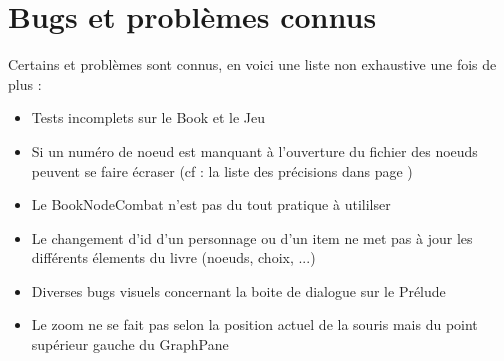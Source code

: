 	\section{Bugs et problèmes connus}

		Certains et problèmes sont connus, en voici une liste non exhaustive une fois de plus :

		\begin{itemize}
			\item{Tests incomplets sur le Book et le Jeu}
			\item{Si un numéro de noeud est manquant à l'ouverture du fichier des noeuds peuvent se faire écraser (cf : la liste des précisions dans  page \pageref{subsec:noeud_delete_missing_index})}
			\item{Le BookNodeCombat n'est pas du tout pratique à utililser}
			\item{Le changement d'id d'un personnage ou d'un item ne met pas à jour les différents élements du livre (noeuds, choix, ...)}
			\item{Diverses bugs visuels concernant la boite de dialogue sur le Prélude}
			\item{Le zoom ne se fait pas selon la position actuel de la souris mais du point supérieur gauche du GraphPane}
		\end{itemize}
